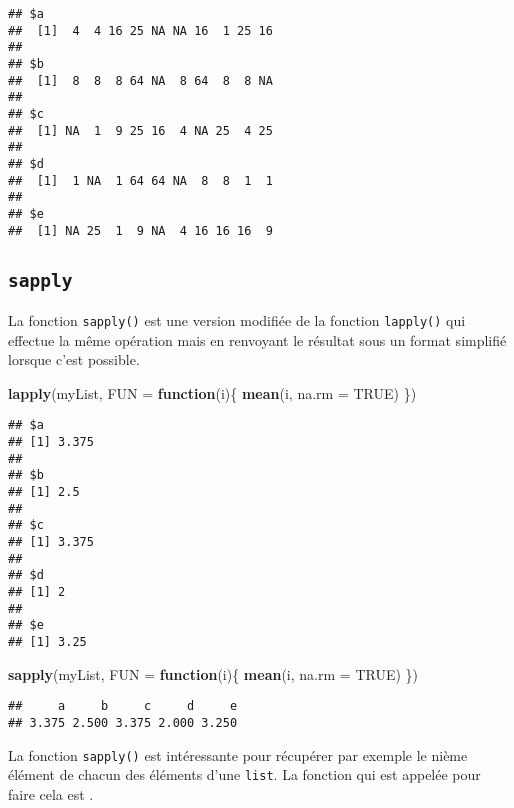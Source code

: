 \documentclass[]{book}
\newenvironment{Shaded}{\begin{snugshade}}{\end{snugshade}}
\newcommand{\KeywordTok}[1]{\textcolor[rgb]{0.13,0.29,0.53}{\textbf{#1}}}
\newcommand{\DataTypeTok}[1]{\textcolor[rgb]{0.13,0.29,0.53}{#1}}
\newcommand{\OtherTok}[1]{\textcolor[rgb]{0.56,0.35,0.01}{#1}}
\newcommand{\ControlFlowTok}[1]{\textcolor[rgb]{0.13,0.29,0.53}{\textbf{#1}}}
\newcommand{\NormalTok}[1]{#1}
\theoremstyle{definition}
\theoremstyle{definition}
\theoremstyle{definition}
\theoremstyle{remark}
\begin{document}
\begin{verbatim}
## $a
##  [1]  4  4 16 25 NA NA 16  1 25 16
## 
## $b
##  [1]  8  8  8 64 NA  8 64  8  8 NA
## 
## $c
##  [1] NA  1  9 25 16  4 NA 25  4 25
## 
## $d
##  [1]  1 NA  1 64 64 NA  8  8  1  1
## 
## $e
##  [1] NA 25  1  9 NA  4 16 16 16  9
\end{verbatim}

\subsection{\texorpdfstring{\texttt{sapply}}{sapply}}\label{l17lapply}

La fonction \texttt{sapply()} est une version modifiée de la fonction
\texttt{lapply()} qui effectue la même opération mais en renvoyant le
résultat sous un format simplifié lorsque c'est possible.

\begin{Shaded}
\begin{Highlighting}[]
\KeywordTok{lapply}\NormalTok{(myList, }\DataTypeTok{FUN =} \ControlFlowTok{function}\NormalTok{(i)\{}
  \KeywordTok{mean}\NormalTok{(i, }\DataTypeTok{na.rm =} \OtherTok{TRUE}\NormalTok{)}
\NormalTok{\})}
\end{Highlighting}
\end{Shaded}

\begin{verbatim}
## $a
## [1] 3.375
## 
## $b
## [1] 2.5
## 
## $c
## [1] 3.375
## 
## $d
## [1] 2
## 
## $e
## [1] 3.25
\end{verbatim}

\begin{Shaded}
\begin{Highlighting}[]
\KeywordTok{sapply}\NormalTok{(myList, }\DataTypeTok{FUN =} \ControlFlowTok{function}\NormalTok{(i)\{}
  \KeywordTok{mean}\NormalTok{(i, }\DataTypeTok{na.rm =} \OtherTok{TRUE}\NormalTok{)}
\NormalTok{\})}
\end{Highlighting}
\end{Shaded}

\begin{verbatim}
##     a     b     c     d     e 
## 3.375 2.500 3.375 2.000 3.250
\end{verbatim}

La fonction \texttt{sapply()} est intéressante pour récupérer par
exemple le nième élément de chacun des éléments d'une \texttt{list}. La
fonction qui est appelée pour faire cela est
\texttt{\textquotesingle{}{[}{[}\textquotesingle{}}.
\end{document}
